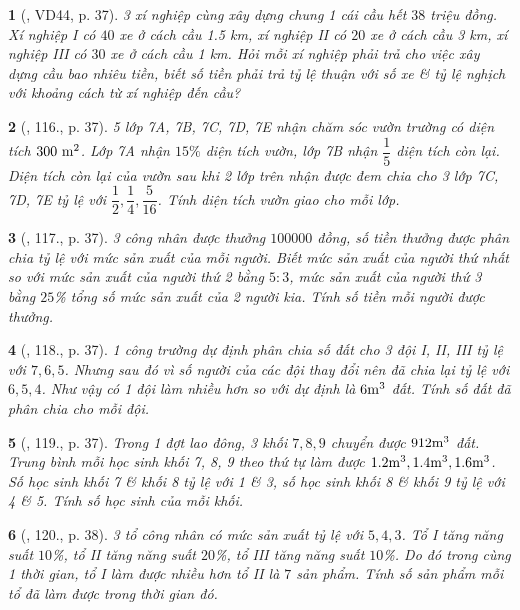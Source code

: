 \documentclass{article}
\newtheorem{baitoan}{}
\begin{document}
\begin{baitoan}[\cite{Binh_Toan_7_tap_1}, VD44, p. 37]
	3 xí nghiệp cùng xây dựng chung 1 cái cầu hết $38$ triệu đồng. Xí nghiệp I có $40$ xe ở cách cầu {\rm1.5 km}, xí nghiệp II có $20$ xe ở cách cầu {\rm3 km}, xí nghiệp III có $30$ xe ở cách cầu {\rm1 km}. Hỏi mỗi xí nghiệp phải trả cho việc xây dựng cầu bao nhiêu tiền, biết số tiền phải trả tỷ lệ thuận với số xe \& tỷ lệ nghịch với khoảng cách từ xí nghiệp đến cầu?
\end{baitoan}

\begin{baitoan}[\cite{Binh_Toan_7_tap_1}, 116., p. 37]
	5 lớp 7A, 7B, 7C, 7D, 7E nhận chăm sóc vườn trường có diện tích $\rm300\ m^2$. Lớp 7A nhận $15\%$ diện tích vườn, lớp 7B nhận $\dfrac{1}{5}$ diện tích còn lại. Diện tích còn lại của vườn sau khi 2 lớp trên nhận được đem chia cho 3 lớp 7C, 7D, 7E tỷ lệ với $\dfrac{1}{2},\dfrac{1}{4},\dfrac{5}{16}$. Tính diện tích vườn giao cho mỗi lớp.
\end{baitoan}

\begin{baitoan}[\cite{Binh_Toan_7_tap_1}, 117., p. 37]
	3 công nhân được thưởng $100000$ đồng, số tiền thưởng được phân chia tỷ lệ với mức sản xuất của mỗi người. Biết mức sản xuất của người thứ nhất so với mức sản xuất của người thứ 2 bằng $5:3$, mức sản xuất của người thứ 3 bằng $25$\% tổng số mức sản xuất của 2 người kia. Tính số tiền mỗi người được thưởng.
\end{baitoan}

\begin{baitoan}[\cite{Binh_Toan_7_tap_1}, 118., p. 37]
	1 công trường dự định phân chia số đất cho 3 đội I, II, III tỷ lệ với $7,6,5$. Nhưng sau đó vì số người của các đội thay đổi nên đã chia lại tỷ lệ với $6,5,4$. Như vậy có 1 đội làm nhiều hơn so với dự định là $\rm6m^3$ đất. Tính số đất đã phân chia cho mỗi đội.
\end{baitoan}

\begin{baitoan}[\cite{Binh_Toan_7_tap_1}, 119., p. 37]
	Trong 1 đợt lao đông, 3 khối $7,8,9$ chuyển được $\rm912m^3$ đất. Trung bình mỗi học sinh khối 7, 8, 9 theo thứ tự làm được $\rm1.2m^3,1.4m^3,1.6m^3$. Số học sinh khối 7 \& khối 8 tỷ lệ với 1 \& 3, số học sinh khối 8 \& khối 9 tỷ lệ với 4 \& 5. Tính số học sinh của mỗi khối.
\end{baitoan}
	
\begin{baitoan}[\cite{Binh_Toan_7_tap_1}, 120., p. 38]
	3 tổ công nhân có mức sản xuất tỷ lệ với $5,4,3$. Tổ I tăng năng suất $10$\%, tổ II tăng năng suất $20$\%, tổ III tăng năng suất $10$\%. Do đó trong cùng 1 thời gian, tổ I làm được nhiều hơn tổ II là $7$ sản phẩm. Tính số sản phẩm mỗi tổ đã làm được trong thời gian đó.
\end{baitoan}
\end{document}
